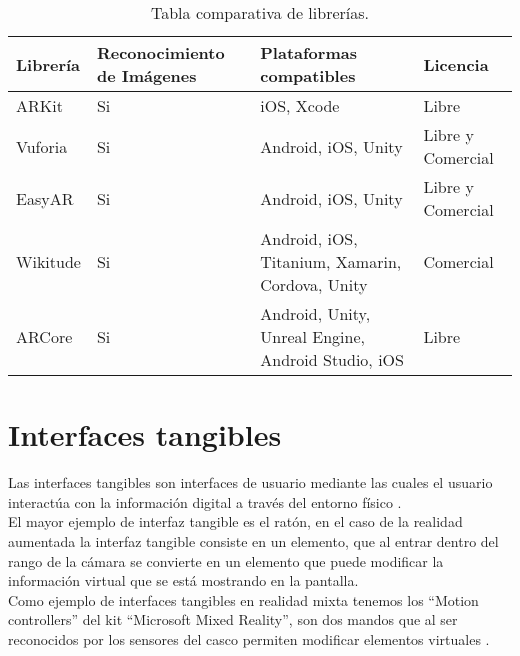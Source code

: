 \begin{itemize}
\begin{itemize}
\begin{table}[h]
\begin{center}
\begin{tabular}{|p{1.5cm}|p{2cm}|p{7cm}|p{2cm}|}
      \hline
        \rowcolor{Gray} \textbf{Librería}
        & \textbf{Reconocimiento de Imágenes}
        & \textbf{Plataformas compatibles}
        & \textbf{Licencia}\\

      \hline
      ARKit
      & Si
      & iOS, Xcode
      & Libre\\

      \hline
      Vuforia
      & Si
      & Android, iOS, Unity
      & Libre y Comercial\\

      \hline
      EasyAR
      & Si
      & Android, iOS, Unity
      & Libre y Comercial\\

      \hline
      Wikitude
      & Si
      & Android, iOS, Titanium, Xamarin, Cordova, Unity
      & Comercial\\

      \hline
      ARCore
      & Si
      & Android, Unity, Unreal Engine, Android Studio, iOS
      & Libre\\

      \hline

    \end{tabular}

    \caption{Tabla comparativa de librerías.}
    \label{tabla-librerias}

  \end{center}
\end{table}

\section{Interfaces tangibles}
Las interfaces tangibles son interfaces de usuario mediante las cuales el usuario interactúa con la información digital a través del entorno físico \cite{ullmer}.\\

El mayor ejemplo de interfaz tangible es el ratón, en el caso de la realidad aumentada la interfaz tangible consiste en un elemento, que al entrar dentro del rango de la cámara se convierte en un elemento que puede modificar la información virtual que se está mostrando en la pantalla.\\

Como ejemplo de interfaces tangibles en realidad mixta tenemos los “Motion controllers” del kit “Microsoft Mixed Reality”, son dos mandos que al ser reconocidos por los sensores del casco permiten modificar elementos virtuales \cite{windows-mixed-reality}.\\


\end{itemize}
\end{itemize}
